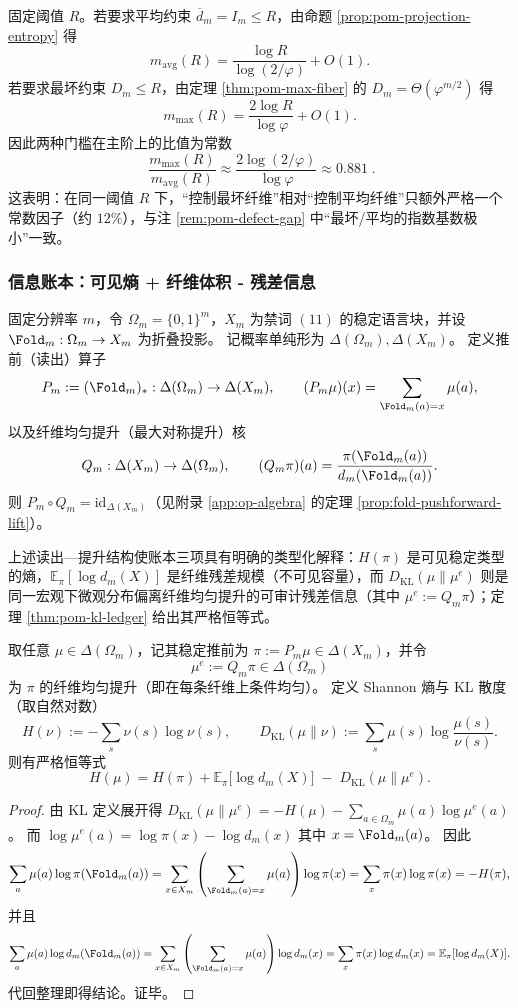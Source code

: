 \begin{remark}\label{rem:pom-avg-vs-max-threshold}
固定阈值 $R$。若要求平均约束 $\overline d_m=I_m\le R$，由命题 \ref{prop:pom-projection-entropy} 得
\[
m_{\mathrm{avg}}(R)=\frac{\log R}{\log(2/\varphi)}+O(1).
\]
若要求最坏约束 $D_m\le R$，由定理 \ref{thm:pom-max-fiber} 的 $D_m=\Theta(\varphi^{m/2})$ 得
\[
m_{\max}(R)=\frac{2\log R}{\log\varphi}+O(1).
\]
因此两种门槛在主阶上的比值为常数
\[
\boxed{\;
\frac{m_{\max}(R)}{m_{\mathrm{avg}}(R)}
\approx
\frac{2\log(2/\varphi)}{\log\varphi}
\approx 0.881\; }.
\]
这表明：在同一阈值 $R$ 下，“控制最坏纤维”相对“控制平均纤维”只额外严格一个常数因子（约 $12\%$），与注 \ref{rem:pom-defect-gap} 中“最坏/平均的指数基数极小”一致。
\end{remark}
\subsubsection{信息账本：可见熵 + 纤维体积 - 残差信息}\label{subsec:pom-information-ledger}
固定分辨率 $m$，令 $\Omega_m=\{0,1\}^m$，$X_m$ 为禁词 $(11)$ 的稳定语言块，并设 $\Fold_m:\Omega_m\to X_m$ 为折叠投影。
记概率单纯形为 $\Delta(\Omega_m),\Delta(X_m)$。
定义推前（读出）算子
\[
P_m:=(\Fold_m)_*:\Delta(\Omega_m)\to\Delta(X_m),
\qquad
(P_m\mu)(x)=\sum_{\Fold_m(a)=x}\mu(a),
\]
以及纤维均匀提升（最大对称提升）核
\[
Q_m:\Delta(X_m)\to\Delta(\Omega_m),
\qquad
(Q_m\pi)(a)=\frac{\pi(\Fold_m(a))}{d_m(\Fold_m(a))}.
\]
则 $P_m\circ Q_m=\mathrm{id}_{\Delta(X_m)}$（见附录 \ref{app:op-algebra} 的定理 \ref{prop:fold-pushforward-lift}）。

上述读出—提升结构使账本三项具有明确的类型化解释：$H(\pi)$ 是可见稳定类型的熵，$\mathbb{E}_{\pi}[\log d_m(X)]$ 是纤维残差规模（不可见容量），而 $D_{\mathrm{KL}}(\mu\|\mu^{e})$ 则是同一宏观下微观分布偏离纤维均匀提升的可审计残差信息（其中 $\mu^{e}:=Q_m\pi$）；定理 \ref{thm:pom-kl-ledger} 给出其严格恒等式。

\begin{theorem}\label{thm:pom-kl-ledger}
取任意 $\mu\in\Delta(\Omega_m)$，记其稳定推前为 $\pi:=P_m\mu\in\Delta(X_m)$，并令
\[
\mu^{e}:=Q_m\pi\in\Delta(\Omega_m)
\]
为 $\pi$ 的纤维均匀提升（即在每条纤维上条件均匀）。
定义 Shannon 熵与 KL 散度（取自然对数）
\[
H(\nu):=-\sum_{s}\nu(s)\log\nu(s),
\qquad
D_{\mathrm{KL}}(\mu\|\nu):=\sum_{s}\mu(s)\log\frac{\mu(s)}{\nu(s)}.
\]
则有严格恒等式
\[
\boxed{\;
H(\mu)=H(\pi)+\mathbb{E}_{\pi}\!\bigl[\log d_m(X)\bigr]\;-\;D_{\mathrm{KL}}(\mu\|\mu^{e}).
\;}
\]
\end{theorem}
\begin{proof}
由 KL 定义展开得
\(
D_{\mathrm{KL}}(\mu\|\mu^{e})=-H(\mu)-\sum_{a\in\Omega_m}\mu(a)\log\mu^{e}(a)
\)。
而
\(
\log\mu^{e}(a)=\log\pi(x)-\log d_m(x)
\)
其中 $x=\Fold_m(a)$。
因此
\[
\sum_{a}\mu(a)\log\pi(\Fold_m(a))
=\sum_{x\in X_m}\left(\sum_{\Fold_m(a)=x}\mu(a)\right)\log\pi(x)
=\sum_{x}\pi(x)\log\pi(x)
=-H(\pi),
\]
并且
\[
\sum_{a}\mu(a)\log d_m(\Fold_m(a))
=\sum_{x\in X_m}\left(\sum_{\Fold_m(a)=x}\mu(a)\right)\log d_m(x)
=\sum_{x}\pi(x)\log d_m(x)
=\mathbb{E}_{\pi}[\log d_m(X)].
\]
代回整理即得结论。证毕。
\end{proof}

